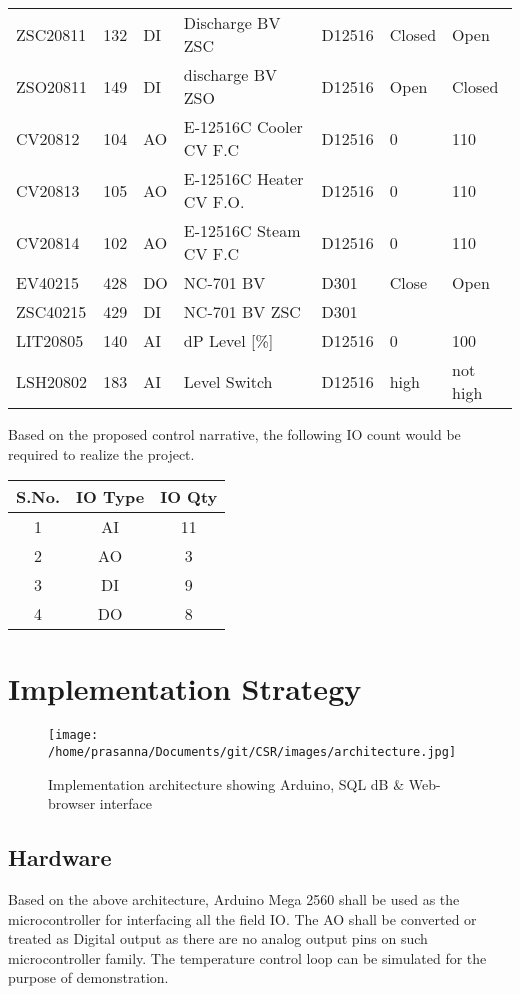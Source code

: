 \documentclass[a4paper,oneside]{article}
\begin{document}
\begin{center}
\begin{tabular}{lllllll}
ZSC20811 & 132 & DI & Discharge BV ZSC & D12516 & Closed & Open\\
ZSO20811 & 149 & DI & discharge BV ZSO & D12516 & Open & Closed\\
CV20812 & 104 & AO & E-12516C Cooler CV F.C & D12516 & 0 & 110\\
CV20813 & 105 & AO & E-12516C Heater CV F.O. & D12516 & 0 & 110\\
CV20814 & 102 & AO & E-12516C Steam CV F.C & D12516 & 0 & 110\\
EV40215 & 428 & DO & NC-701 BV & D301 & Close & Open\\
ZSC40215 & 429 & DI & NC-701 BV ZSC & D301 &  & \\
LIT20805 & 140 & AI & dP Level [\%] & D12516 & 0 & 100\\
LSH20802 & 183 & AI & Level Switch & D12516 & high & not high\\
\end{tabular}
\end{center}

Based on the proposed control narrative, the following IO count would be required to realize the project. 
\begin{center}
\begin{tabular}{ccc}
S.No. & IO Type & IO Qty\\
\hline
1 & AI & 11\\
2 & AO & 3\\
3 & DI & 9\\
4 & DO & 8\\
\end{tabular}
\end{center}

\clearpage
\section{Implementation Strategy}
\label{sec:org036fe17}
\begin{figure}[htbp]
\centering
\texttt{[image: /home/prasanna/Documents/git/CSR/images/architecture.jpg]}
\caption{Implementation architecture showing Arduino, SQL dB \& Web-browser interface}
\end{figure}
\clearpage
\subsection{Hardware}
\label{sec:orgee5b227}
Based on the above architecture, Arduino Mega 2560 shall be used as
the microcontroller for interfacing all the field IO. The AO shall be
converted or treated as Digital output as there are no analog output
pins on such microcontroller family. The temperature control loop can
be simulated for the purpose of demonstration. 
\end{document}
